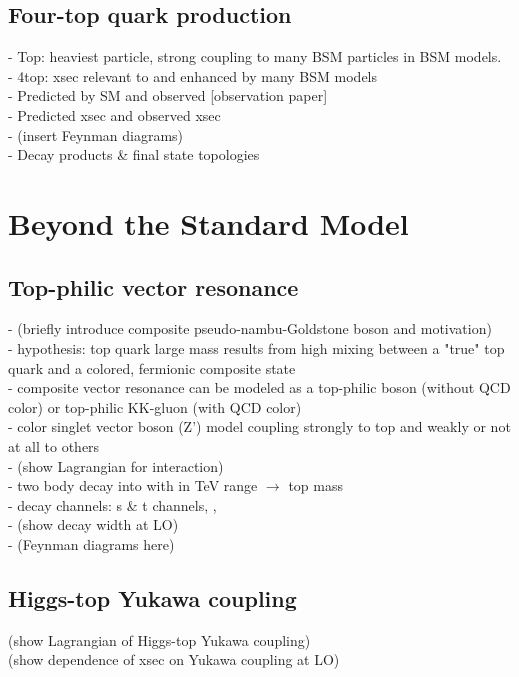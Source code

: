 \documentclass[../thesis.tex]{subfiles}
\begin{document}
\subsection{Four-top quark production}
\label{sec:4top}
- Top: heaviest particle, strong coupling to many BSM particles in BSM models.\\
- 4top: xsec relevant to and enhanced by many BSM models\\
- Predicted by SM and observed [observation paper]\\
- Predicted xsec and observed xsec\\
- (insert Feynman diagrams)\\
- Decay products \& final state topologies



\section{Beyond the Standard Model}

\subsection*{Top-philic vector resonance}
- (briefly introduce composite pseudo-nambu-Goldstone boson and motivation)\\
- hypothesis: top quark large mass results from high mixing between a "true" top quark and a  colored, fermionic composite state\\
- composite vector resonance can be modeled as a top-philic \Zp boson (without QCD color) or top-philic KK-gluon (with QCD color)\\
- color singlet vector boson (Z') model coupling strongly to top and weakly or not at all to others\\
- (show Lagrangian for interaction)\\
- two body decay \Zp into \ttbar with \mZp in TeV range $\rightarrow$ top mass\\
- decay channels: \ttZp s \& t channels, \tWZp, \tjZp\\
- (show decay width at LO)\\
- (Feynman diagrams here)

\subsection*{Higgs-top Yukawa coupling}
(show Lagrangian of Higgs-top Yukawa coupling)\\
(show dependence of \tttt xsec on Yukawa coupling at LO)
\end{document}
